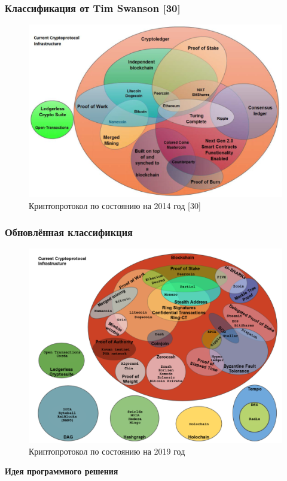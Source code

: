 \documentclass{beamer}
\begin{document}
\begin{frame}
    \frametitle{Классификация от Tim Swanson [30]}
    \begin{figure}
        \includegraphics[width=0.9\columnwidth]{current_protocols}
        \caption{Криптопротокол по состоянию на 2014 год [30]}
    \end{figure}
\end{frame}

\begin{frame}
    \frametitle{Обновлённая классификция}
    \begin{figure}
        \centering
        \includegraphics[width=0.8\columnwidth]{myprotocol_w_title}
        \caption{Криптопротокол по состоянию на 2019 год}
    \end{figure}
\end{frame}

\begin{frame}
    \centering
    \LARGE \bfseries \color{white}
    Идея программного решения
\end{frame}
\end{document}
